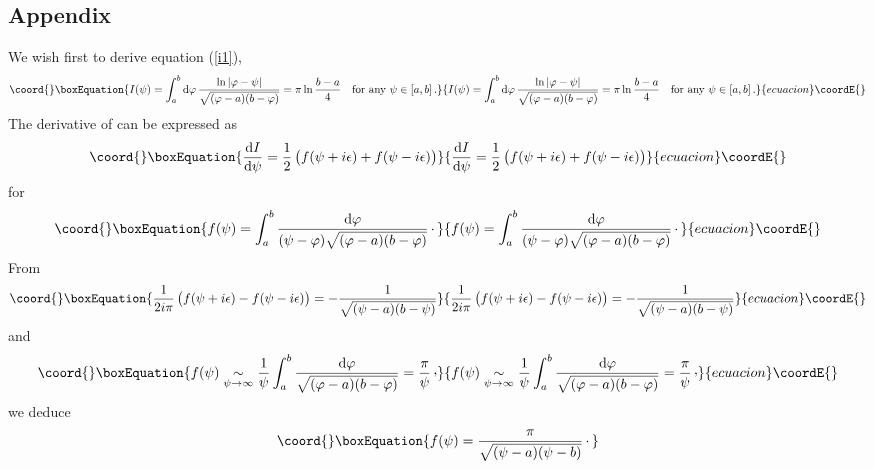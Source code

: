 \documentclass[a4paper,12pt]{article}
\def\cvp{\raise 2pt\hbox{,}}
\def\d{{\rm d}}
\begin{document}
%
\begin{appendix}
%
\section*{Appendix}
%
We wish first to derive equation (\ref{i1}),
%
\begin{equation}\coord{}\boxEquation{
\label{appeq}
I(\psi)=\int_{a}^{b} \d\varphi\, {\ln |\varphi -\psi|\over
\sqrt{(\varphi -a)(b-\varphi)}} =\pi \ln {b-a\over 4}\quad
{\rm for\ any}\ \psi\in [a,b]\, .
}{
I(\psi)=\int_{a}^{b} \d\varphi\, {\ln |\varphi -\psi|\over
\sqrt{(\varphi -a)(b-\varphi)}} =\pi \ln {b-a\over 4}\quad
{\rm for\ any}\ \psi\in [a,b]\, .
}{ecuacion}\coordE{}\end{equation}
%
The derivative of \coordHE{} can be expressed as
%
\begin{equation}\coord{}\boxEquation{
\label{a1}
{\d I\over\d\psi} = {1\over 2} \left(\strut f(\psi + i\epsilon) + f(\psi 
-i\epsilon)\right)
}{
{\d I\over\d\psi} = {1\over 2} \left(\strut f(\psi + i\epsilon) + f(\psi 
-i\epsilon)\right)
}{ecuacion}\coordE{}\end{equation}
%
for
%
\begin{equation}\coord{}\boxEquation{
\label{a2}
f(\psi) = \int_{a}^{b} {\d\varphi\over (\psi -\varphi)
\sqrt{(\varphi -a)(b-\varphi)}}\, \cdotp
}{
f(\psi) = \int_{a}^{b} {\d\varphi\over (\psi -\varphi)
\sqrt{(\varphi -a)(b-\varphi)}}\, \cdotp
}{ecuacion}\coordE{}\end{equation}
%
From 
%
\begin{equation}\coord{}\boxEquation{
\label{a3}
{1\over 2i\pi} \left(\strut f(\psi + i\epsilon) - f(\psi 
-i\epsilon)\right) = -{1\over\sqrt{(\psi -a)(b-\psi)}}
}{
{1\over 2i\pi} \left(\strut f(\psi + i\epsilon) - f(\psi 
-i\epsilon)\right) = -{1\over\sqrt{(\psi -a)(b-\psi)}}
}{ecuacion}\coordE{}\end{equation}
%
and
%
\begin{equation}\coord{}\boxEquation{
\label{a4}
f(\psi) \mathrel{\mathop{\kern 0pt\sim}\limits_{\psi\rightarrow\infty}^{}}
{1\over\psi}\int_{a}^{b} 
{\d\varphi\over\sqrt{(\varphi -a)(b-\varphi)}} = {\pi\over\psi}\,\cvp
}{
f(\psi) \mathrel{\mathop{\kern 0pt\sim}\limits_{\psi\rightarrow\infty}^{}}
{1\over\psi}\int_{a}^{b} 
{\d\varphi\over\sqrt{(\varphi -a)(b-\varphi)}} = {\pi\over\psi}\,\cvp
}{ecuacion}\coordE{}\end{equation}
%
we deduce
%
\begin{equation}\coord{}\boxEquation{
\label{a5}
f(\psi) = {\pi\over\sqrt{(\psi -a)(\psi -b)}}\,\cdotp
}
\end{equation}
\end{appendix}
\end{document}
